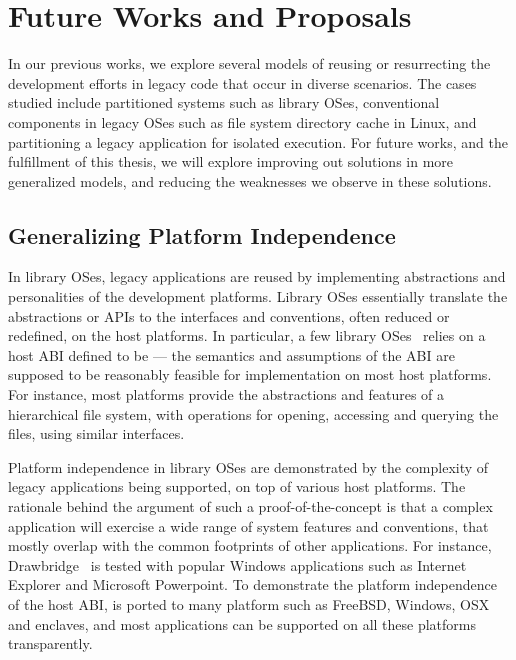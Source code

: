 \chapter{Future Works and Proposals}
\label{chap:future}

In our previous works, we explore several models of
reusing or resurrecting the development efforts in legacy code
that occur in diverse scenarios.
The cases studied include
partitioned systems such as library OSes,
conventional components in legacy OSes such as file system directory cache in Linux,
and partitioning a legacy \java{} application for isolated execution.
For future works, and the fulfillment of this thesis,
we will explore improving out solutions in more generalized models,
and reducing the weaknesses we observe in these solutions.



\section{Generalizing Platform Independence}

In library OSes, legacy applications are reused
by implementing abstractions and personalities of the development platforms.
Library OSes essentially translate the abstractions or APIs
to the interfaces and conventions, often reduced or redefined, on the host platforms.
In particular, a few library OSes~\citep{porter11drawbridge, baumann13bascule, baumann14haven, tsai14graphene}
relies on a host ABI defined to be 
--- the semantics and assumptions of the ABI are supposed to be
reasonably feasible for implementation
on most host platforms.
For instance, most platforms provide the abstractions and features
of a hierarchical file system,
with operations for opening,
accessing and querying the files,
using similar interfaces.


Platform independence in library OSes are demonstrated by the complexity of legacy applications being supported,
on top of various host platforms.
The rationale behind the argument of such a proof-of-the-concept is that
a complex application will exercise a wide range of system features and conventions,
that mostly overlap with the common footprints of other applications.
For instance, Drawbridge~\cite{porter11drawbridge} is tested with
popular Windows applications such as Internet Explorer and Microsoft Powerpoint.
To demonstrate the platform independence of the host ABI,
\graphene{} is ported to many platform such as FreeBSD, Windows, OSX and \intel{} \sgx{} enclaves,
and most applications can be supported on all these platforms
transparently.

